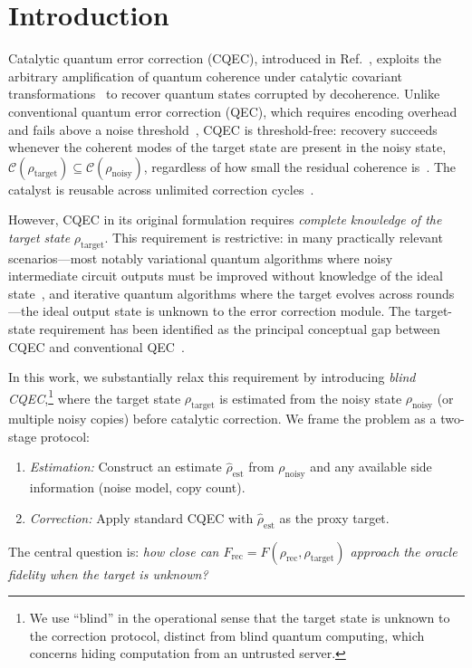\documentclass[prx,twocolumn,superscriptaddress,longbibliography,floatfix]{revtex4-2}
\newcommand{\CC}{\mathcal{C}}
\newcommand{\Frec}{F_\mathrm{rec}}
\newcommand{\rhot}{\rho_\mathrm{target}}
\newcommand{\rhon}{\rho_\mathrm{noisy}}
\newcommand{\rhor}{\rho_\mathrm{rec}}
\newcommand{\rhoe}{\hat{\rho}_\mathrm{est}}
\begin{document}
\maketitle


\section{Introduction}
\label{sec:introduction}

Catalytic quantum error correction (CQEC), introduced in Ref.~\cite{Wakaura2026unified}, exploits the arbitrary amplification of quantum coherence under catalytic covariant transformations~\cite{Shiraishi2024} to recover quantum states corrupted by decoherence.
Unlike conventional quantum error correction (QEC), which requires encoding overhead and fails above a noise threshold~\cite{Shor1995,Gottesman1997,Knill2005}, CQEC is threshold-free: recovery succeeds whenever the coherent modes of the target state are present in the noisy state, $\CC(\rhot) \subseteq \CC(\rhon)$, regardless of how small the residual coherence is~\cite{Shiraishi2024}.
The catalyst is reusable across unlimited correction cycles~\cite{Wakaura2026unified,Wakaura2026catalyst}.

However, CQEC in its original formulation requires \emph{complete knowledge of the target state} $\rhot$.
This requirement is restrictive: in many practically relevant scenarios---most notably variational quantum algorithms where noisy intermediate circuit outputs must be improved without knowledge of the ideal state~\cite{Peruzzo2014,Cerezo2021}, and iterative quantum algorithms where the target evolves across rounds---the ideal output state is unknown to the error correction module.
The target-state requirement has been identified as the principal conceptual gap between CQEC and conventional QEC~\cite{Wakaura2026unified}.

In this work, we substantially relax this requirement by introducing \emph{blind CQEC},\footnote{We use ``blind'' in the operational sense that the target state is unknown to the correction protocol, distinct from blind quantum computing, which concerns hiding computation from an untrusted server.} where the target state $\rhot$ is estimated from the noisy state $\rhon$ (or multiple noisy copies) before catalytic correction.
We frame the problem as a two-stage protocol:
\begin{enumerate}
\item \emph{Estimation:} Construct an estimate $\rhoe$ from $\rhon$ and any available side information (noise model, copy count).
\item \emph{Correction:} Apply standard CQEC with $\rhoe$ as the proxy target.
\end{enumerate}
The central question is: \emph{how close can $\Frec = F(\rhor, \rhot)$ approach the oracle fidelity when the target is unknown?}
\end{document}
